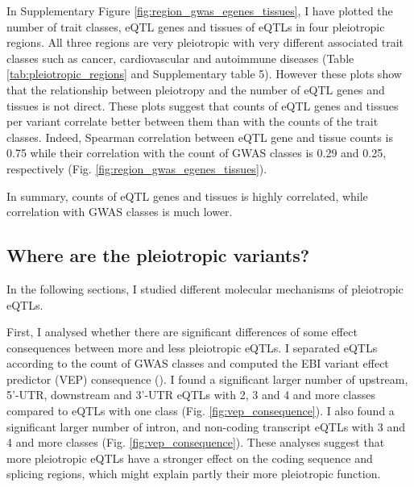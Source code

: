 In Supplementary Figure \ref{fig:region_gwas_egenes_tissues}, I have plotted the number of trait classes, eQTL genes and tissues of
eQTLs in four pleiotropic regions.
%
All three regions are very pleiotropic with very different associated trait classes such as cancer, cardiovascular and
autoimmune diseases (Table \ref{tab:pleiotropic_regions} and Supplementary table 5).
%
However these plots show that the relationship between pleiotropy and the number of eQTL genes and tissues is not direct.
%
These plots suggest that counts of eQTL genes and tissues per variant correlate better between them than with the counts of the trait classes.
%
Indeed, Spearman correlation between eQTL gene and tissue counts is 0.75 while their correlation with the count of GWAS classes is 0.29 and 0.25, respectively (Fig. \ref{fig:region_gwas_egenes_tissues}).

In summary, counts of eQTL genes and tissues is highly correlated, while correlation with GWAS classes is much lower.

\subsection*{Where are the pleiotropic variants?}


In the following sections, I studied different molecular mechanisms of pleiotropic eQTLs.
%

First, I analysed whether there are significant differences of some effect consequences between more and less pleiotropic eQTLs.
%
I separated eQTLs according to the count of GWAS classes and computed the EBI variant effect predictor (VEP) consequence (\citep{2016.Cunningham.McLaren}).
%
I found a significant larger number of upstream, 5'-UTR, downstream and 3'-UTR eQTLs
with 2, 3 and 4 and more classes compared to eQTLs with one class (Fig. \ref{fig:vep_consequence}).
%
I also found a significant larger number of intron, and non-coding transcript eQTLs
with 3 and 4 and more classes (Fig. \ref{fig:vep_consequence}).
%
These analyses suggest that more pleiotropic eQTLs have a stronger effect on
the coding sequence and splicing regions, which might explain partly their more pleiotropic function.

